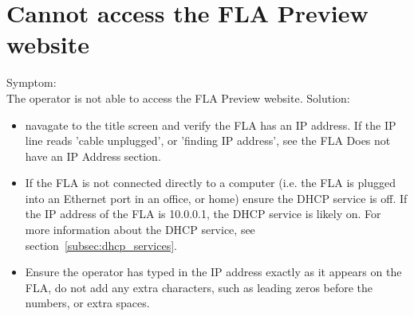 \documentclass[11pt, oneside]{book}
\begin{document}
\section{Cannot access the FLA Preview website}
Symptom:\\
The operator is not able to access the FLA Preview website.
Solution:\\
\begin{itemize}
\item navagate to the title screen and verify the FLA has an IP address. If the IP line reads 'cable unplugged', or 'finding IP address', see the FLA Does not have an IP Address section.
\item If the FLA is not connected directly to a computer (i.e. the FLA is plugged into an Ethernet port in an office, or home) ensure the DHCP service is off. If the IP address of the FLA is 10.0.0.1, the DHCP service is likely on. For more information about the DHCP service, see section~\ref{subsec:dhcp_services}.
\item Ensure the operator has typed in the IP address exactly as it appears on the FLA, do not add any extra characters, such as leading zeros before the numbers, or extra spaces.
\end{itemize}
\end{document}
